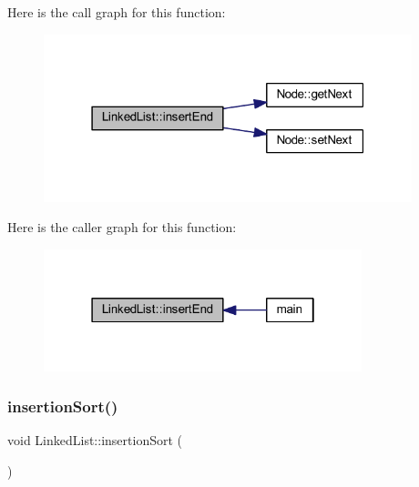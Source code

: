 Here is the call graph for this function\+:
\nopagebreak
\begin{figure}[H]
\begin{center}
\leavevmode
\includegraphics[width=303pt]{class_linked_list_a8b87744316967b16f272be10cd6718ed_cgraph}
\end{center}
\end{figure}
Here is the caller graph for this function\+:
\nopagebreak
\begin{figure}[H]
\begin{center}
\leavevmode
\includegraphics[width=262pt]{class_linked_list_a8b87744316967b16f272be10cd6718ed_icgraph}
\end{center}
\end{figure}
\mbox{\label{class_linked_list_a04e277f98f8e6e5426f19ad780915e00}} 
\subsubsection{\texorpdfstring{insertion\+Sort()}{insertionSort()}}
{\footnotesize\ttfamily void Linked\+List\+::insertion\+Sort (\begin{DoxyParamCaption}{ }\end{DoxyParamCaption})}

